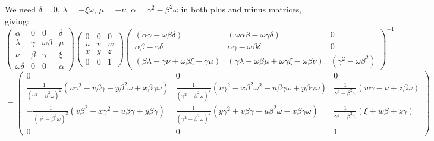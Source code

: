 \documentclass[10pt]{article}
\begin{document}
We need $\delta =0$, $\lambda =-\xi \omega $, $\mu =-\nu $, $\alpha =\gamma
^{2}-\beta ^{2}\omega $ in both plus and minus matrices, giving: 
\[
\left( 
\begin{array}{cccc}
\alpha & 0 & 0 & \delta \\ 
\lambda & \gamma & \omega \beta & \mu \\ 
\nu & \beta & \gamma & \xi \\ 
\omega \delta & 0 & 0 & \alpha%
\end{array}%
\right) \left( 
\begin{array}{ccc}
0 & 0 & 0 \\ 
u & v & w \\ 
x & y & z \\ 
0 & 0 & 1%
\end{array}%
\right) \left( 
\begin{array}{ccc}
(\alpha \gamma -\omega \beta \delta ) & (\omega \alpha \beta -\omega \gamma
\delta ) & 0 \\ 
\alpha \beta -\gamma \delta & \alpha \gamma -\omega \beta \delta & 0 \\ 
(\beta \lambda -\gamma \nu +\omega \beta \xi -\gamma \mu ) & (\gamma \lambda
-\omega \beta \mu +\omega \gamma \xi -\omega \beta \nu ) & (\gamma
^{2}-\omega \beta ^{2})%
\end{array}%
\right) ^{-1} 
\]
\[
=\left( 
\begin{array}{ccc}
0 & 0 & 0 \\ 
\frac{1}{\left( \gamma ^{2}-\beta ^{2}\omega \right) ^{2}}\left( u\gamma
^{2}-v\beta \gamma -y\beta ^{2}\omega +x\beta \gamma \omega \right) & \frac{1%
}{\left( \gamma ^{2}-\beta ^{2}\omega \right) ^{2}}\left( v\gamma
^{2}-x\beta ^{2}\omega ^{2}-u\beta \gamma \omega +y\beta \gamma \omega
\right) & \frac{1}{\gamma ^{2}-\beta ^{2}\omega }\left( w\gamma -\nu +z\beta
\omega \right) \\ 
-\frac{1}{\left( \gamma ^{2}-\beta ^{2}\omega \right) ^{2}}\left( v\beta
^{2}-x\gamma ^{2}-u\beta \gamma +y\beta \gamma \right) & \frac{1}{\left(
\gamma ^{2}-\beta ^{2}\omega \right) ^{2}}\left( y\gamma ^{2}+v\beta \gamma
-u\beta ^{2}\omega -x\beta \gamma \omega \right) & \frac{1}{\gamma
^{2}-\beta ^{2}\omega }\left( \xi +w\beta +z\gamma \right) \\ 
0 & 0 & 1%
\end{array}%
\right) \allowbreak 
\]
\end{document}
